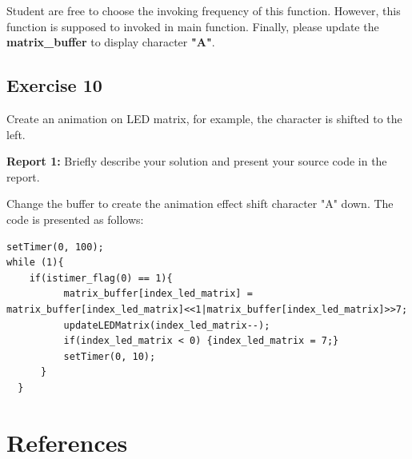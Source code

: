 \documentclass[twoside, final]{hcmut_report}
\begin{document}
Student are free to choose the invoking frequency of this function. However, this function is supposed to invoked in main function. Finally, please update the \textbf{matrix\_buffer} to display character \textbf{"A"}.

\subsection{Exercise 10}
Create an animation on LED matrix, for example, the character is shifted to the left. 

\textbf{Report 1: } Briefly describe your solution and present your source code in the report.

Change the buffer to create the animation effect shift character "A" down. The code is presented as follows:
\begin{lstlisting}[caption= the while loop on main function]
	  setTimer(0, 100);
while (1){
	if(istimer_flag(0) == 1){
		  matrix_buffer[index_led_matrix] = matrix_buffer[index_led_matrix]<<1|matrix_buffer[index_led_matrix]>>7;
		  updateLEDMatrix(index_led_matrix--);
		  if(index_led_matrix < 0) {index_led_matrix = 7;}
		  setTimer(0, 10);
	  }
  }
\end{lstlisting}

\pagebreak
\section*{References}
\end{document}
